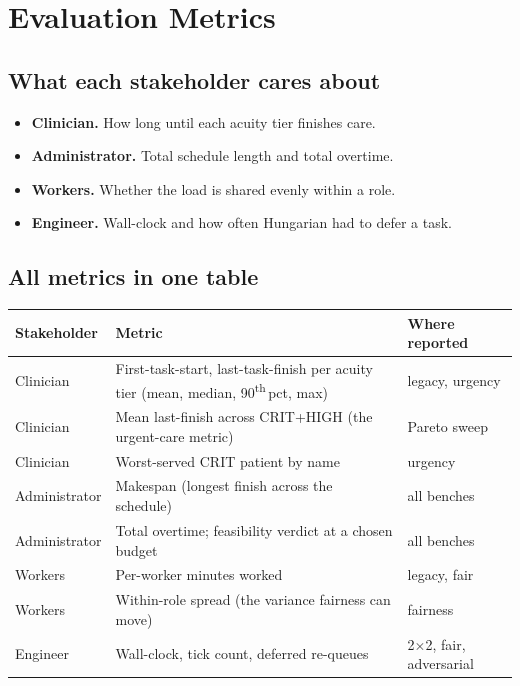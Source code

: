 \section{Evaluation Metrics}
\label{sec:metrics}

\subsection{What each stakeholder cares about}

\begin{itemize}
  \item \textbf{Clinician.}\;
        How long until each acuity tier finishes care.
  \item \textbf{Administrator.}\;
        Total schedule length and total overtime.
  \item \textbf{Workers.}\;
        Whether the load is shared evenly within a role.
  \item \textbf{Engineer.}\;
        Wall-clock and how often Hungarian had to defer a task.
\end{itemize}

\subsection{All metrics in one table}

\begin{table}[H]
\centering
\small
\setlength{\tabcolsep}{4pt}
\begin{tabularx}{\textwidth}{l X l}
\toprule
\textbf{Stakeholder} & \textbf{Metric} & \textbf{Where reported} \\
\midrule
Clinician
  & First-task-start, last-task-finish per acuity tier
    (mean, median, 90\textsuperscript{th}\,pct, max)
  & legacy, urgency \\
Clinician
  & Mean last-finish across CRIT+HIGH (the urgent-care metric)
  & Pareto sweep \\
Clinician
  & Worst-served CRIT patient by name
  & urgency \\
Administrator
  & Makespan (longest finish across the schedule)
  & all benches \\
Administrator
  & Total overtime; feasibility verdict at a chosen budget
  & all benches \\
Workers
  & Per-worker minutes worked
  & legacy, fair \\
Workers
  & Within-role spread (the variance fairness can move)
  & fairness \\
Engineer
  & Wall-clock, tick count, deferred re-queues
  & 2$\times$2, fair, adversarial \\
\bottomrule
\end{tabularx}
\end{table}

